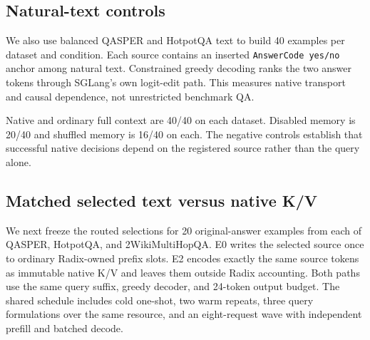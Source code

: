 \documentclass[10pt]{article}
\begin{document}
\subsection{Natural-text controls}
We also use balanced QASPER and HotpotQA text to build 40 examples per dataset
and condition. Each source contains an inserted \texttt{AnswerCode yes/no}
anchor among natural text. Constrained greedy decoding ranks the two answer
tokens through SGLang's own logit-edit path. This measures native transport and
causal dependence, not unrestricted benchmark QA.

\begin{table}[!htbp]
\centering
\small
\caption{SGLang live-runner natural-text transport controls.}

\label{tab:sglang-natural}
\end{table}

Native and ordinary full context are 40/40 on each dataset. Disabled memory is
20/40 and shuffled memory is 16/40 on each. The negative controls establish
that successful native decisions depend on the registered source rather than
the query alone.

\subsection{Matched selected text versus native K/V}
We next freeze the routed selections for 20 original-answer examples from each
of QASPER, HotpotQA, and 2WikiMultiHopQA. E0 writes the selected source once to
ordinary Radix-owned prefix slots. E2 encodes exactly the same source tokens as
immutable native K/V and leaves them outside Radix accounting. Both paths use
the same query suffix, greedy decoder, and 24-token output budget. The shared
schedule includes cold one-shot, two warm repeats, three query formulations
over the same resource, and an eight-request wave with independent prefill and
batched decode.

\begin{table}[!htbp]
\centering
\scriptsize
\caption{Matched-selection quality on the shared three-engine cohort. All
parity pools 840 request pairs per engine across four schedules.}
\resizebox{\linewidth}{!}{%
}
\label{tab:sglang-matched-quality}
\end{table}

\begin{table}[!htbp]
\centering
\scriptsize
\caption{Macro E2/E0 execution-cost ratios; lower is better. Cold includes
ingestion, concurrent is inverse requests/s, and E2 usable is milliseconds.}
\resizebox{\linewidth}{!}{%
}
\label{tab:sglang-matched-latency}
\end{table}
\end{document}
